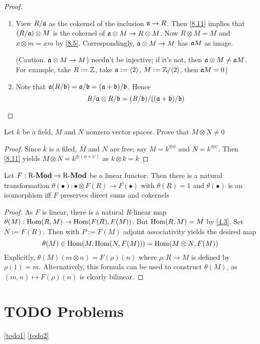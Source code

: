 \documentclass[11pt]{article}
\begin{document}
\begin{proof}
\begin{enumerate}
\item View \(R/\mathfrak{a}\) as the cokernel of the inclusion \(\mathfrak{a}\to R\). Then
\ref{8.11} implies that \((R/\mathfrak{a})\otimes M\) is the cokernel of \(\mathfrak{a}\otimes
      M\to R\otimes M\).
Now \(R\otimes M=M\)
and \(x\otimes m=xm\) by \ref{8.5}. Correspondingly, \(\mathfrak{a}\otimes M\to M\)
has \(\mathfrak{a} M\) as image.

(Caution. \(\mathfrak{a}\otimes M\to M\)) needn't be injective; if it's not, then
\(\mathfrak{a}\otimes M\neq\mathfrak{a} M\). For example, take \(R:=\mathbb{Z}\), take
\(\mathfrak{a}:=\langle2\rangle\), \(M:=\mathbb{Z}/\langle2\rangle\), then \(\mathfrak{a} M=0\))

\item Note that \(\mathfrak{a}(R/\mathfrak{b})=\mathfrak{a}/\mathfrak{b}=(\mathfrak{a}+\mathfrak{b})/\mathfrak{b}\). Hence
\begin{equation*}
R/\mathfrak{a}\otimes R/\mathfrak{b}=(R/\mathfrak{b})/((\mathfrak{a}+\mathfrak{b})/\mathfrak{b})
\end{equation*}
\end{enumerate}
\end{proof}

\begin{exercise}
\label{8.14}
Let \(k\) be a field, \(M\) and \(N\) nonzero vector spaces. Prove that
\(M\otimes N\neq0\)
\end{exercise}

\begin{proof}
Since \(k\) is a filed, \(M\) and \(N\) are free; say \(M=k^{\oplus\phi}\)
and \(N=k^{\oplus\psi}\). Then \ref{8.11} yields \(M\otimes
   N=k^{\oplus(\phi\times\psi)}\) as \(k\otimes k=k\)
\end{proof}

\begin{theorem}[Watts]
Let \(F:\operatorname{R-\textbf{Mod}}\to\operatorname{R-\textbf{Mod}}\) be a linear functor. Then there is a natural
transformation \(\theta(\bullet):\bullet\otimes F(R)\to F(\bullet)\) with
\(\theta(R)=1\) and \(\theta(\bullet)\) is an isomorphism iff \(F\) preserves direct
sums and cokernels
\end{theorem}

\begin{proof}
As \(F\) is linear, there is a natural \(R\)-linear map
\(\theta(M):\operatorname{Hom}(R,M)\to\operatorname{Hom}(F(R),F(M))\). But \(\operatorname{Hom}(R,M)=M\) by \ref{4.3}. Set
\(N:=F(R)\). Then with \(P:=F(M)\) adjoint associativity yields the desired
map
\begin{equation*}
\theta(M)\in\operatorname{Hom}(M,\operatorname{Hom}(N,F(M)))=\operatorname{Hom}(M\otimes N,F(M))
\end{equation*}
Explicitly, \(\theta(M)(m\otimes n)=F(\rho)(n)\) where \(\rho:R\to M\) is defined by
\(\rho(1)=m\). Alternatively, this formula can be used to construct \(\theta(M)\), as
\((m,n)\mapsto F(\rho)(n)\) is clearly bilinear.
\end{proof}








\section{{\bfseries\sffamily TODO} Problems}
\label{sec:org5a899d8}
\ref{todo1}
\ref{todo2}
\end{document}
